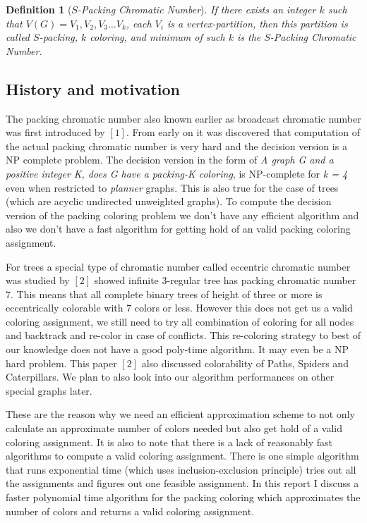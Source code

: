 \documentclass{article}
\newtheorem{definition}{Definition}[section]
\theoremstyle{remark}
\begin{document}
\begin{definition}[\textit{$S$-Packing Chromatic Number}]
    \textit{If there exists an integer $k$ such that $V(G) = V_1, V_2, V_3 \dots V_k$,
    each $V_i$ is a vertex-partition, then this partition is called
    $S$-packing, $k$ coloring, and minimum of such $k$ is the $S$-Packing Chromatic Number.}
\end{definition}

\subsection{History and motivation}
The packing chromatic number also known earlier as broadcast chromatic number was first introduced by \cite{brevsar2007packing} $\left[1\right]$. From early on it was discovered that computation of the actual packing chromatic number is very hard and the decision version is a \textsf{NP} complete problem. The decision version in the form of \textit{A graph G and a positive integer K, does G have a packing-K coloring}, is \textsf{NP}-complete for \textit{k = 4} even when restricted to \textit{planner} graphs. This is also true for the case of trees (which are acyclic undirected unweighted graphs). To compute the decision version of the packing coloring problem we don't have any efficient algorithm and also we don't have a fast algorithm for getting hold of an valid packing coloring assignment.

For trees a special type of chromatic number called eccentric chromatic number was studied by \cite{sloper2004eccentric} $\left[2\right]$ showed infinite 3-regular tree has packing chromatic number $7$. This means that all complete binary trees of height of three or more is eccentrically colorable with 7 colors or less. However this does not get us a valid coloring assignment, we still need to try all combination of coloring for all nodes and backtrack and re-color in case of conflicts. This re-coloring strategy to best of our knowledge does not have a good poly-time algorithm. It may even be a \textsf{NP} hard problem. This paper \cite{sloper2004eccentric} $\left[2\right]$ also discussed colorability of Paths, Spiders and Caterpillars. We plan to also look into our algorithm performances on other special graphs later.

These are the reason why we need an efficient approximation scheme to not only calculate an approximate number of colors needed but also get hold of a valid coloring assignment. It is also to note that there is a lack of reasonably fast algorithms to compute a valid coloring assignment. There is one simple algorithm that runs exponential time (which uses inclusion-exclusion principle) tries out all the assignments and figures out one feasible assignment. In this report I discuss a faster polynomial time algorithm for the packing coloring which approximates the number of colors and returns a valid coloring assignment.
\end{document}
